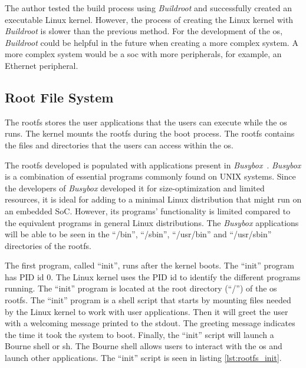 The author tested the build process using \textit{Buildroot} and successfully created an executable Linux kernel. However, the process of creating the Linux kernel with \textit{Buildroot} is slower than the previous method. For the development of the \acrshort{os}, \textit{Buildroot} could be helpful in the future when creating a more complex system. A more complex system would be a \acrshort{soc} with more peripherals, for example, an Ethernet peripheral.

\subsection{Root File System}
\label{subection:linux_rootfs}
The \acrfull{rootfs} stores the user applications that the users can execute while the \acrshort{os} runs. The kernel mounts the \acrshort{rootfs} during the boot process. The \acrshort{rootfs} contains the files and directories that the users can access within the \acrshort{os}.

The \acrshort{rootfs} developed is populated with applications present in \textit{Busybox}~\cite{busybox}. \textit{Busybox} is a combination of essential programs commonly found on UNIX systems. Since the developers of \textit{Busybox} developed it for size-optimization and limited resources, it is ideal for adding to a minimal Linux distribution that might run on an embedded SoC. However, its programs' functionality is limited compared to the equivalent programs in general Linux distributions. The \textit{Busybox} applications will be able to be seen in the \enquote{/bin}, \enquote{/sbin}, \enquote{/usr/bin} and \enquote{/usr/sbin} directories of the \acrshort{rootfs}.

The first program, called \enquote{init}, runs after the kernel boots. The \enquote{init} program has PID id 0. The Linux kernel uses the PID id to identify the different programs running. The \enquote{init} program is located at the root directory (\enquote{/}) of the \acrshort{os} \acrlong{rootfs}. The \enquote{init} program is a shell script that starts by mounting files needed by the Linux kernel to work with user applications. Then it will greet the user with a welcoming message printed to the stdout. The greeting message indicates the time it took the system to boot. Finally, the \enquote{init} script will launch a Bourne shell or sh. The Bourne shell allows users to interact with the \acrshort{os} and launch other applications. The \enquote{init} script is seen in listing \ref{lst:rootfs_init}.

